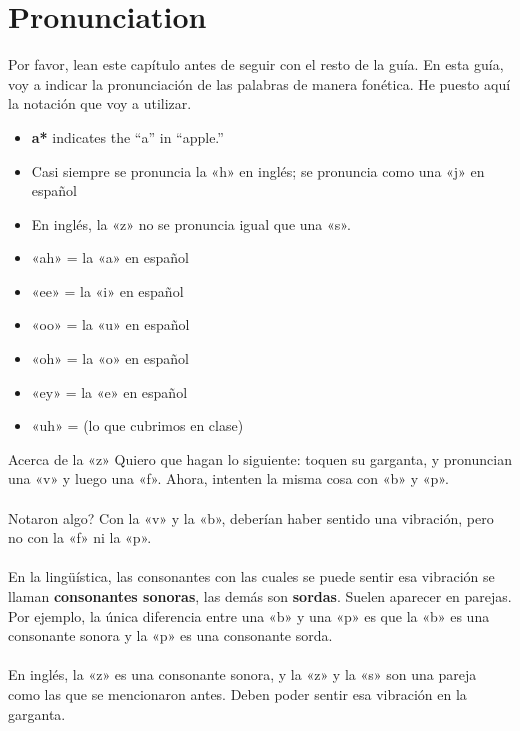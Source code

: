 \chapter{Pronunciation}

Por favor, lean este cap\'itulo antes de seguir con el resto de la gu\'ia.
En esta guía, voy a indicar la pronunciaci\'on de las palabras de manera fon\'etica.
He puesto aquí la notaci\'on que voy a utilizar.


\begin{itemize}
	\item \textbf{a*} indicates the ``a'' in ``apple.''
	\item Casi siempre se pronuncia la «h» en inglés;
			se pronuncia como una «j» en espa\~nol
	\item En inglés, la «z» no se pronuncia igual que una «s».
	\item «ah» = la «a» en espa\~nol
	\item «ee» = la «i» en espa\~nol
	\item «oo» = la «u» en espa\~nol
	\item «oh» = la «o» en espa\~nol
	\item «ey» = la «e» en espa\~nol
	\item «uh» =  (lo que cubrimos en clase)
\end{itemize}

\begin{conf}{Acerca de la «z»}
Quiero que hagan lo siguiente: toquen su garganta, y pronuncian una «v» y luego una «f».
	Ahora, intenten la misma cosa con «b» y «p».\\
\\
\textquestiondown Notaron algo? Con la «v» y la «b», deber\'ian haber
	sentido una vibraci\'on, pero no con la «f» ni la «p». \\
\\
En la ling\"u\'istica, las consonantes con las cuales se puede sentir esa vibraci\'on
	se llaman \textbf{consonantes sonoras}, las dem\'as son \textbf{sordas}. Suelen
	aparecer en parejas. Por ejemplo, la \'unica diferencia entre una «b» y una «p» es
	que la «b» es una consonante sonora y la «p» es una consonante sorda.\\
\\
En ingl\'es, la «z» es una consonante sonora, y la «z» y la «s» son una pareja como las que se mencionaron antes. Deben poder sentir esa vibraci\'on en la garganta.
\end{conf}
